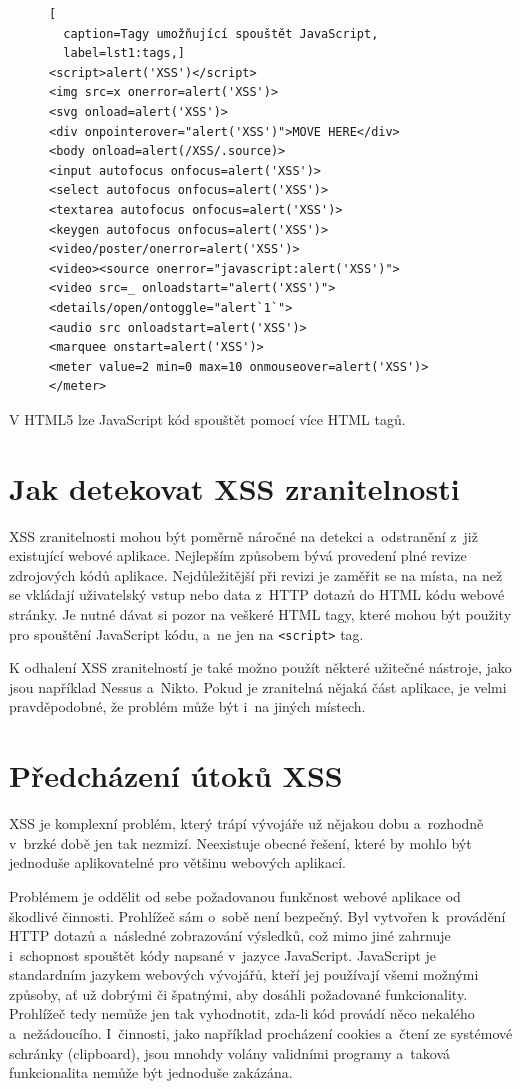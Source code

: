 \documentclass[11pt, conference, a4paper]{IEEEtran}
\begin{document}
\begin{figure}[h]
\begin{lstlisting}[
  caption=Tagy umožňující spouštět JavaScript,
  label=lst1:tags,]
<script>alert('XSS')</script>
<img src=x onerror=alert('XSS')>
<svg onload=alert('XSS')>
<div onpointerover="alert('XSS')">MOVE HERE</div>
<body onload=alert(/XSS/.source)>
<input autofocus onfocus=alert('XSS')>
<select autofocus onfocus=alert('XSS')>
<textarea autofocus onfocus=alert('XSS')>
<keygen autofocus onfocus=alert('XSS')>
<video/poster/onerror=alert('XSS')>
<video><source onerror="javascript:alert('XSS')">
<video src=_ onloadstart="alert('XSS')">
<details/open/ontoggle="alert`1`">
<audio src onloadstart=alert('XSS')>
<marquee onstart=alert('XSS')>
<meter value=2 min=0 max=10 onmouseover=alert('XSS')></meter>
\end{lstlisting}
\end{figure}

V HTML5 lze JavaScript kód spouštět pomocí více HTML tagů.~\cite{swisskyrepo2024XSS}


\section{Jak detekovat XSS zranitelnosti}
XSS zranitelnosti mohou být poměrně náročné na detekci a~odstranění z~již existující webové aplikace. Nejlepším způsobem bývá provedení plné revize zdrojových kódů aplikace. Nejdůležitější při revizi je zaměřit se na místa, na než se vkládají uživatelský vstup nebo data z~HTTP dotazů do HTML kódu webové stránky. Je nutné dávat si pozor na veškeré HTML tagy, které mohou být použity pro spouštění JavaScript kódu, a~ne jen na \texttt{<script>} tag.

K odhalení XSS zranitelností je také možno použít některé užitečné nástroje, jako jsou například Nessus a~Nikto. Pokud je zranitelná nějaká část aplikace, je velmi pravděpodobné, že problém může být i~na jiných místech.



\section{Předcházení útoků XSS}
XSS je komplexní problém, který trápí vývojáře už nějakou dobu a~rozhodně v~brzké době jen tak nezmizí. Neexistuje obecné řešení, které by mohlo být jednoduše aplikovatelné pro většinu webových aplikací.

Problémem je oddělit od sebe požadovanou funkčnost webové aplikace od škodlivé činnosti. Prohlížeč sám o~sobě není bezpečný. Byl vytvořen k~provádění HTTP dotazů a~následné zobrazování výsledků, což mimo jiné zahrnuje i~schopnost spouštět kódy napsané v~jazyce JavaScript. JavaScript je standardním jazykem webových vývojářů, kteří jej používají všemi možnými způsoby, ať už dobrými či špatnými, aby dosáhli požadované funkcionality. Prohlížeč tedy nemůže jen tak vyhodnotit, zda-li kód provádí něco nekalého a~nežádoucího. I~činnosti, jako například procházení cookies a~čtení ze systémové schránky (clipboard), jsou mnohdy volány validními programy a~taková funkcionalita nemůže být jednoduše zakázána.
\end{document}
